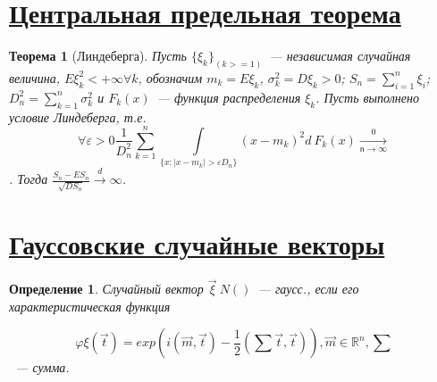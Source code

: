 \documentclass[11pt]{article}
\begin{document}
\section{\underline{Центральная предельная теорема}}
    \newtheorem{thm}{Теорема}[section]
    \begin{thm}[Линдеберга]
    	Пусть $\{\xi_k\}_(k>=1)$~--- независимая случайная величина, $E \xi_k^2 < +\infty \forall k$, обозначим $m_k = E \xi_k$, $\sigma_k^2 = D\xi_k > 0$; $S_n = \sum_{i = 1}^{n} \xi_i$; $D^2_n = \sum_{k = 1}^{n} \sigma_k^2$ и $F_k(x)$~--- функция распределения $\xi_k$. Пусть выполнено условие Линдеберга, т.е.
    	$$
    	\forall \varepsilon > 0 \frac{1}{D_n^2} \sum_{k = 1}^{n} \int\limits_{\{x:|x-m_k| > \varepsilon D_n \}} (x-m_k)^2 d~F_k(x) \xrightarrow[\mathsf{n} \rightarrow \infty] 0
    	$$.
    	Тогда $\frac{S_n - E S_n}{\sqrt{DS_n}} \overset{d}{\longrightarrow} \infty $.
    \end{thm}
\section{\underline{Гауссовские случайные векторы}}
\newtheorem{definition}[section]{Определение}
\begin{definition}
Случайный вектор $\overrightarrow{\xi} ~ N()$~--- гаусс., если его характеристическая функция

$$
\varphi\xi(\vec{t}) = exp(i(\vec{m},\vec{t}) - \frac{1}{2}(\sum \vec{t},\vec{t})), \vec{m}\in\mathds{R}^n, \sum
$$
~--- сумма.
\end{definition}
\end{document}
